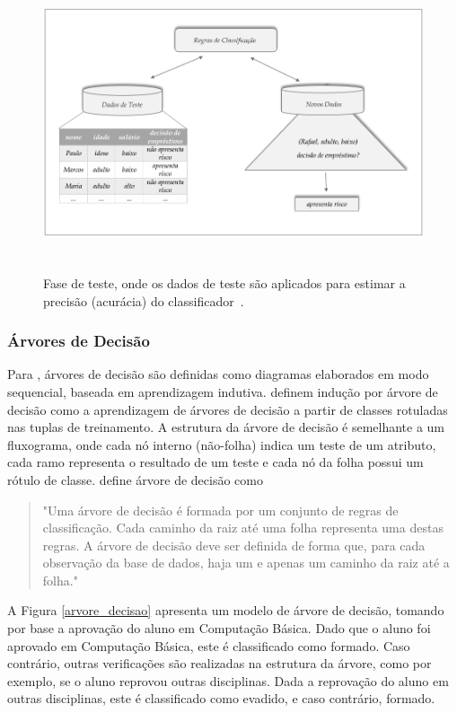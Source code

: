 \begin{figure}[!htb]
	\centering
	{\includegraphics[width=15cm, height=8cm]{images/classificacao2}}
	\caption {Fase de teste, onde os dados de teste são aplicados para estimar a precisão (acurácia) do classificador~\citep{han_kamber2006}.}
	\label{teste}
\end{figure}

\subsubsection{Árvores de Decisão} \label{3subsubtitle3}

Para \citet{coelho_leite}, árvores de decisão são definidas como diagramas elaborados em modo sequencial, baseada em aprendizagem indutiva. \citet{han_kamber2006} definem indução por árvore de decisão como a aprendizagem de árvores de decisão a partir de classes rotuladas nas tuplas de treinamento. A estrutura da árvore de decisão é semelhante a um fluxograma, onde cada nó interno (não-folha) indica um teste de um atributo, cada ramo representa o resultado de um teste e cada nó da folha possui um rótulo de classe. \citet{correa2007} define árvore de decisão como 
\begin{quotation}
	"Uma árvore de decisão é formada por um conjunto de regras de classificação. Cada caminho da raiz até uma folha representa uma destas regras. A árvore de decisão deve ser definida de forma que, para cada observação da base de dados, haja um e apenas um caminho da raiz até a folha." 
\end{quotation}

A Figura \ref{arvore_decisao} apresenta um modelo de árvore de decisão, tomando por base a aprovação do aluno em Computação Básica. Dado que o aluno foi aprovado em Computação Básica, este é classificado como formado. Caso contrário, outras verificações são realizadas na estrutura da árvore, como por exemplo, se o aluno reprovou outras disciplinas. Dada a reprovação do aluno em outras disciplinas,  este é classificado como evadido, e caso contrário, formado.

